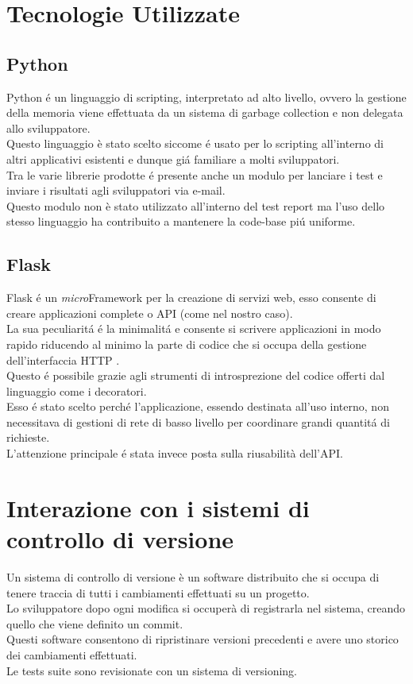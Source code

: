     \section{Tecnologie Utilizzate}  
        \subsection{Python}
            Python \'e un linguaggio di scripting, interpretato ad alto livello, ovvero la gestione della memoria viene effettuata da un sistema di garbage collection e non delegata allo sviluppatore.\\
            Questo linguaggio è stato scelto siccome \'e usato per lo scripting all'interno di altri applicativi esistenti e dunque gi\'a familiare a molti sviluppatori.\\
            
            Tra le varie librerie prodotte \'e presente anche un modulo per lanciare i test e inviare i risultati agli sviluppatori via e-mail.\\
            Questo modulo non è stato utilizzato all'interno del test report ma l'uso dello stesso linguaggio ha contribuito a mantenere la code-base pi\'u uniforme.
        \subsection{Flask}  
            Flask \'e un \textit{micro}Framework per la creazione di servizi web, esso consente di creare applicazioni complete o API (come nel nostro caso).\\
            La sua peculiarit\'a \'e la minimalit\'a e consente si scrivere applicazioni in modo rapido riducendo al minimo la parte di codice che si occupa della gestione dell'interfaccia HTTP \cite{HTTP}.\\
            Questo \'e possibile grazie agli strumenti di introsprezione del codice offerti dal linguaggio come i decoratori.\\

            Esso \'e stato scelto perch\'e l'applicazione, essendo destinata all'uso interno, non necessitava di gestioni di rete di basso livello per coordinare grandi quantit\'a di richieste.\\
            L'attenzione principale \'e stata invece posta sulla riusabilità dell'API.

    \section{Interazione con i sistemi di controllo di versione}           
        Un sistema di controllo di versione è un software distribuito che si occupa di tenere traccia di tutti i cambiamenti effettuati su un progetto.\\
        Lo sviluppatore dopo ogni modifica si occuperà di registrarla nel sistema, creando quello che viene definito un commit.\\
        Questi software consentono di ripristinare versioni precedenti e avere uno storico dei cambiamenti effettuati.\\
        Le tests suite sono revisionate con un sistema di versioning.\\
        

